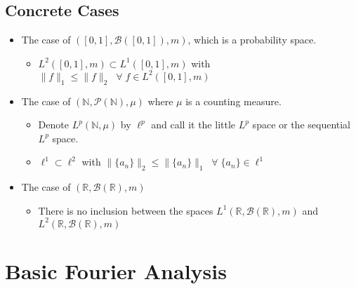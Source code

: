 \documentclass[12pt]{article}
\newcommand{\N}{\mathbb{N}}
\newcommand{\R}{\mathbb{R}}
\newcommand{\Borel}{\mathcal{B}(\mathbb{R})}
\newcommand{\forany}{\; \forall \;}
\begin{document}
\subsection{Concrete Cases}
\smallskip
\begin{itemize}
    \item The case of $([0,1],\mathcal{B}([0,1]), m)$, which is a probability space.
    \begin{itemize}
        \item $L^2([0,1], m)\subset L^1([0,1],m)$ with $\|f\|_1\leq \|f\|_2 \;\forany f\in L^2([0,1],m)$
    \end{itemize}
    \item The case of $(\N, \mathcal{P}(\N), \mu)$ where $\mu$ is a counting measure.
    \begin{itemize}
        \item Denote $L^p(\N, \mu)$ by $\ell^p$ and call it the little $L^p$ space or the sequential $L^p$ space.
        \item $\ell^1 \subset \ell^2$ with $\|\{a_n\}\|_2\leq \|\{a_n\}\|_1 \; \forany \{a_n\}\in \ell^1$
    \end{itemize}
    \item The case of $(\R, \Borel, m)$
    \begin{itemize}
        \item There is no inclusion between the spaces $L^1(\R, \Borel, m)$ and $L^2(\R, \Borel, m)$
    \end{itemize}
\end{itemize}
\bigskip

\section{Basic Fourier Analysis}
\smallskip
\end{document}
